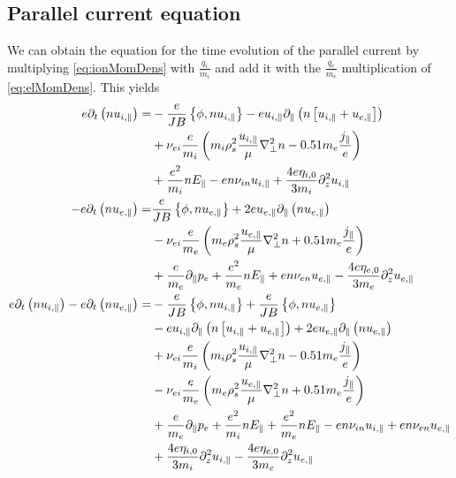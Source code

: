 \subsection{Parallel current equation}
%
We can obtain the equation for the time evolution of the parallel current by multiplying \cref{eq:ionMomDens} with $\frac{q_i}{m_i}$ and add it with the $\frac{q_e}{m_e}$ multiplication of \cref{eq:elMomDens}.
This yields
%
%
\begin{align*}
 e \partial_t\L( n u_{i,\|}\R)
 =&
 -\frac{e}{JB}\L\{\phi, n u_{i,\|}\R\}
 -e u_{i,\|}\partial_\|\L( n \L[u_{i,\|}+ u_{e,\|} \R]\R)
   \\&
 + \nu_{ei}\frac{e}{m_i}\L(
   m_i \rho_s^2\frac{u_{i,\|}}{\mu} \grad_\perp^2 n
   -0.51  m_e \frac{j_\|}{e}
   \R)
   \\&
   +\frac{e^2}{m_i} n  E_\|
 - e n \nu_{i n}u_{i,\|}
 + \frac{4e\eta_{i,0}}{3m_i} \partial_z^2 u_{i,\|}
 \\
 -e \partial_t\L( n u_{e,\|}\R)
 =&
  \frac{e}{JB}\L\{\phi, n u_{e,\|}\R\}
 + 2e u_{e,\|}\partial_\|\L( n  u_{e,\|} \R)
   \\&
 - \nu_{ei}\frac{e}{m_e}\L(
   m_e \rho_s^2\frac{u_{e,\|}}{\mu} \grad_\perp^2 n
   + 0.51 m_e \frac{j_\|}{e}
   \R)
   \\&
   +\frac{e}{m_e} \partial_\| p_e
   + \frac{e^2}{m_e} n E_\|
 + en \nu_{e n}u_{e,\|}
 - \frac{4e\eta_{e,0}}{3m_e} \partial_z^2 u_{e,\|}
 \\
 e \partial_t\L( n u_{i,\|}\R)
 -e \partial_t\L( n u_{e,\|}\R)
 =&
 -\frac{e}{JB}\L\{\phi, n u_{i,\|}\R\}
 +\frac{e}{JB}\L\{\phi, n u_{e,\|}\R\}
   \\&
 -e u_{i,\|}\partial_\|\L( n \L[u_{i,\|}+ u_{e,\|} \R]\R)
 + 2e u_{e,\|}\partial_\|\L( n  u_{e,\|} \R)
   \\&
 + \nu_{ei}\frac{e}{m_i}\L(
   m_i \rho_s^2\frac{u_{i,\|}}{\mu} \grad_\perp^2 n
   - 0.51 m_e \frac{j_\|}{e}
   \R)
   \\&
 - \nu_{ei}\frac{e}{m_e}\L(
   m_e \rho_s^2\frac{u_{e,\|}}{\mu} \grad_\perp^2 n
   + 0.51 m_e \frac{j_\|}{e}
   \R)
   \\&
   +\frac{e}{m_e} \partial_\| p_e
   +\frac{e^2}{m_i} n  E_\|
   + \frac{e^2}{m_e}n E_\|
 - e n \nu_{i n}u_{i,\|}
 + en \nu_{e n}u_{e,\|}
   \\&
 + \frac{4e\eta_{i,0}}{3m_i} \partial_z^2 u_{i,\|}
 - \frac{4e\eta_{e,0}}{3m_e} \partial_z^2 u_{e,\|}
 \\

\end{align*}
